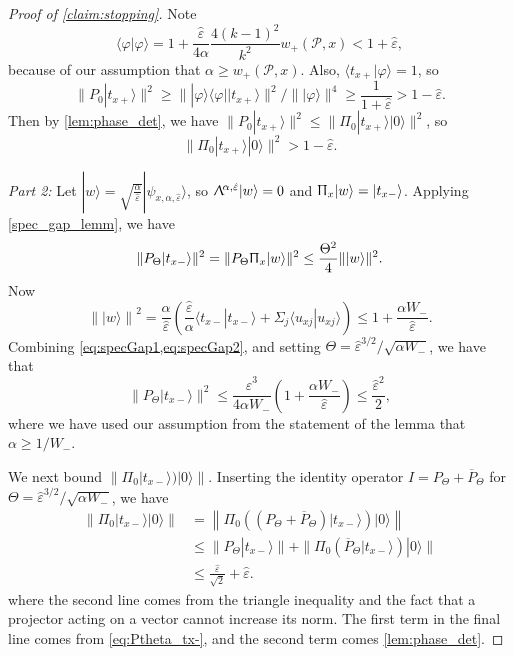 \documentclass[cleveref, autoref, thm-restate,11pt]{article}
\theoremstyle{definition}
\newcommand{\ket}[1]{|#1\rangle}
\newcommand{\proj}[1]{|#1\rangle\!\langle#1|}
\newcommand{\braket}[2]{\langle{#1}|{#2}\rangle}
\newcommand{\Lalp}{{\Uplambda^{\!\alpha,\hat{\varepsilon}}}}
\newcommand{\PHxp}{\Uppi_{x}}
\newcommand{\iner}[1]{\langle{#1}|{#1}\rangle}
\begin{document}
\begin{proof}[Proof of \cref{claim:stopping}]
Note
\begin{equation}
\braket{\varphi}{\varphi}=1+\frac{\hat{\varepsilon}}{4\alpha}\frac{4(k-1)^2}{k^2}w_+(\mathscr P,x)< 1+\hat{\varepsilon},
\end{equation}
because of our assumption that $\alpha\geq w_+(\mathscr P,x)$. Also, $\braket{t_{x+}}{\varphi}=1$,
so 
\begin{equation}
\|P_0\ket{t_{x+}}\|^2\geq \|\proj{\varphi}\ket{t_{x+}}\|^2/\|\ket{\varphi}\|^4\geq \frac{1}{1+\hat{\varepsilon}}> 1-\hat{\varepsilon}.
\end{equation}
Then by \cref{lem:phase_det}, we have $\|P_0\ket{t_{x+}}\|^2\leq \|\Pi_0\ket{t_{x+}}\ket{0}\|^2$, so 
\begin{equation}\label{eq:lined}
\|\Pi_0\ket{t_{x+}}\ket{0}\|^2> 1-\hat{\varepsilon}.
\end{equation}



\vspace{.5cm}
\textit{Part 2:}
Let $\ket{w} = \sqrt{\frac{\alpha}{\hat{\varepsilon}}} \ket{\psi_{x,\alpha,\hat{\varepsilon}}}$, 
 so $\Lalp \ket{w} = 0$ and $\PHxp \ket{w} = \ket{t_{x-}}$.
Applying \cref{spec_gap_lemm}, we have
 \begin{equation}\label{eq:specGap1}
\| P_\Theta \ket{t_{x-}} \|^2 = \| P_\Theta \PHxp\ket{w} \|^2 \leq \frac{\Theta^2 }{4}\| \ket{w}\|^2.
 \end{equation}
Now
\begin{equation}\label{eq:specGap2}
\left\| \ket{w}\right\|^2 = \frac{\alpha}{\hat{\varepsilon}}\left( \frac{\hat{\varepsilon}}{\alpha}\iner{t_{x-}} + \Sigma_j \iner{u_{xj}}\right) \leq 1 + \frac{\alpha W_-}{\hat{\varepsilon}}.
\end{equation}
Combining \cref{eq:specGap1,eq:specGap2}, and setting $\Theta = \hat{\varepsilon}^{3/2}/\sqrt{\alpha W_-}$, we have that
\begin{equation} \label{eq:Ptheta_tx-}
\| P_\Theta \ket{t_{x-}} \|^2\leq \frac{\hat{\varepsilon}^3}{4\alpha W_-}\left( 1 + \frac{\alpha W_-}{\hat{\varepsilon}} \right) \leq \frac{\hat{\varepsilon}^2}{2},
\end{equation}
where we have used our assumption from the statement of the lemma that $\alpha \geq 1/W_-$.

We next bound $\|\Pi_0\ket{t_{x-}})\ket{0}\|.$
Inserting the identity operator $I=P_{\Theta}+\overline{P}_{\Theta}$ for $\Theta=\hat{\varepsilon}^{3/2}/\sqrt{\alpha W_-}$, we have
\begin{align}
 \|\Pi_{0}\ket{t_{x-}}\ket{0}\|
& =\left\|\Pi_{0}\left(\left(P_{\Theta}+\overline{P}_{\Theta}\right)\ket{t_{x-}}\right)\ket{0}\right\|\\
&\leq \|P_{\Theta}\ket{t_{x-}}\|+\|\Pi_{0}\left(\overline{P}_{\Theta}\ket{t_{x-}}\right)\ket{0}\|\\
&\leq \frac{\hat{\varepsilon}}{\sqrt{2}}+\hat{\varepsilon}.
\end{align}
where the second line comes from the triangle inequality and the fact that a projector acting on a vector cannot increase its norm.
The first term in the final line comes from \cref{eq:Ptheta_tx-}, and the second term comes \cref{lem:phase_det}.
\end{proof}
\end{document}
